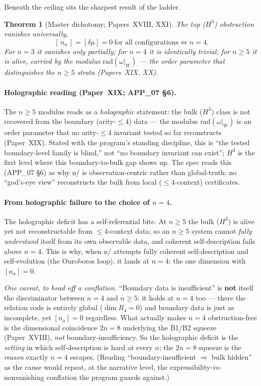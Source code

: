 \documentclass[11pt,a4paper]{article}
\newcommand{\rad}{\mathrm{rad}}
\theoremstyle{plain}
\newtheorem{theorem}{Theorem}[section]
\theoremstyle{definition}
\theoremstyle{remark}
\begin{document}
Beneath the ceiling sits the sharpest result of the ladder.

\begin{theorem}[Master dichotomy; Papers~XVIII, XXI]
The top ($H^3$) obstruction vanishes universally,
\[
   [\,n_a\,]=[\delta\mu]=0 \ \text{for all configurations} \iff n=4 .
\]
For $n=3$ it vanishes only partially; for $n=4$ it is identically trivial; for
$n\ge5$ it is alive, carried by the \emph{modulus} $\rad(\omega|_W)$ --- the order
parameter that distinguishes the $n\ge5$ strata (Papers~XIX, XX).
\end{theorem}

\paragraph{Holographic reading (Paper~XIX; APP\_07 \S6).} The $n\ge5$ modulus reads
as a \emph{holographic} statement: the bulk ($H^3$) class is not recovered from the
boundary (arity-$\le4$) data --- the modulus $\rad(\omega|_W)$ is an order parameter
that no arity-$\le4$ invariant tested so far reconstructs (Paper~XIX). Stated with
the program's standing discipline, this is ``the tested boundary-level family is
blind,'' not ``no boundary invariant can exist''; $H^3$ is the first level where
this boundary-to-bulk gap shows up. The spec reads this (APP\_07 \S6) as why n/ is
observation-centric rather than global-truth: no ``god's-eye view'' reconstructs the
bulk from local ($\le4$-context) certificates.

\paragraph{From holographic failure to the choice of $n=4$.} The holographic
deficit has a self-referential bite. At $n\ge5$ the bulk ($H^3$) is alive yet not
reconstructable from $\le4$-context data; so an $n\ge5$ system cannot \emph{fully
understand} itself from its own observable data, and coherent self-description
fails above $n=4$. This is why, when n/ attempts fully coherent self-description and
self-evolution (the Ouroboros loop), it lands at $n=4$: the one dimension with
$[n_a]=0$.

\emph{One caveat, to head off a conflation.} ``Boundary data is insufficient'' is
\textbf{not} itself the discriminator between $n=4$ and $n\ge5$: it holds at $n=4$
too --- there the relation code is entirely global ($\dim R_4=0$) and boundary data
is just as incomplete, yet $[n_a]=0$ regardless. What actually makes $n=4$
obstruction-free is the dimensional coincidence $2n=8$ underlying the B1/B2 squeeze
(Paper~XVIII), \emph{not} boundary-insufficiency. So the holographic deficit is the
\emph{setting} in which self-description is hard at every $n$; the $2n=8$ squeeze is
the \emph{reason} exactly $n=4$ escapes. (Reading ``boundary-insufficient $\Rightarrow$
bulk hidden'' as the cause would repeat, at the narrative level, the
expressibility-vs-nonvanishing conflation the program guards against.)
\end{document}
